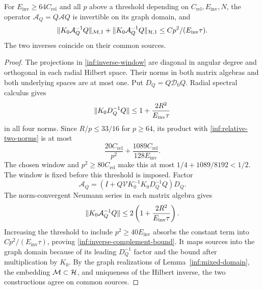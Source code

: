\begin{lemma}\label{inf:inverse-complement}
For $E_{\mathrm{inv}}\ge64C_{\mathrm{rel}}$ and all $p$ above a
threshold depending on $C_{\mathrm{rel}},E_{\mathrm{inv}},N$,
the operator $\mathcal A_Q=Q\mathcal AQ$ is
invertible on its graph domain, and
\begin{equation}\label{inf:inverse-complement-bound}
 \lVert K_0\mathcal A_Q^{-1}Q\rVert_{\mathcal M,1}
 +\lVert K_0\mathcal A_Q^{-1}Q\rVert_{\mathcal{H},1}
 \le Cp^2/(E_{\mathrm{inv}}\tau).
\end{equation}
The two inverses coincide on their common sources.
\end{lemma}
\begin{proof}
The projections in \eqref{inf:inverse-window} are diagonal in
angular degree and orthogonal in each radial Hilbert space.
Their norms in both matrix algebras and both underlying spaces
are at most one.
Put $D_Q=Q\mathcal D_0Q$. Radial spectral calculus gives
\begin{equation}\label{inf:ball-complement-bound}
 \lVert K_0D_Q^{-1}Q\rVert\le1+\frac{2R^2}{E_{\mathrm{inv}}\tau}
\end{equation}
in all four norms.
Since $R/p\le33/16$ for $p\ge64$, its product with
\eqref{inf:relative-two-norms} is at most
\[
 \frac{20C_{\mathrm{rel}}}{p^2}
 +\frac{1089C_{\mathrm{rel}}}{128E_{\mathrm{inv}}}.
\]
The chosen window and $p^2\ge80C_{\mathrm{rel}}$ make this at
most $1/4+1089/8192<1/2$. The window is fixed before this
threshold is imposed.
Factor
\[
 \mathcal A_Q=(I+Q\mathcal VK_0^{-1}K_0D_Q^{-1}Q)D_Q.
\]
The norm-convergent Neumann series in each matrix algebra gives
\[
 \lVert K_0\mathcal A_Q^{-1}Q\rVert
 \le2\left(1+\frac{2R^2}{E_{\mathrm{inv}}\tau}\right).
\]
Increasing the threshold to include $p^2\ge40E_{\mathrm{inv}}$
absorbs the constant term into $Cp^2/(E_{\mathrm{inv}}\tau)$,
proving \eqref{inf:inverse-complement-bound}.
It maps sources into the graph domain because of its leading
$D_Q^{-1}$ factor and the bound after multiplication by $K_0$.
By the graph realizations of Lemma~\ref{inf:mixed-domain}, the
embedding $\mathcal M\subset\mathcal{H}$, and uniqueness of the Hilbert
inverse, the two constructions agree on common sources.
\end{proof}

